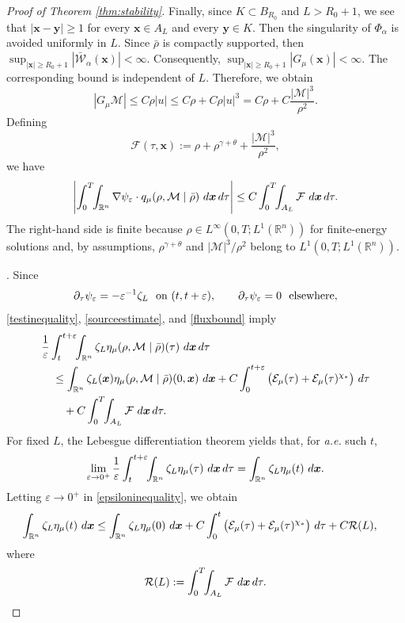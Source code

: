 \documentclass[10pt,a4paper]{amsart}
\newcommand{\R}{\mathbb{R}}
\def\dd{{\, \rm d}}
\begin{document}
\begin{proof}[Proof of {\rm Theorem \ref{thm:stability}}]
Finally, since $K\subset B_{R_0}$ and $L>R_0+1$, 
we see that $|\boldsymbol{x}-\boldsymbol{y}|\ge 1$
for every
$\boldsymbol{x}\in A_L$ and every $\boldsymbol{y}\in K$.
Then the singularity of
$\Phi_\alpha$ is avoided uniformly in $L$.  Since $\bar\rho$ is compactly
supported, then
$\sup_{|\boldsymbol{x}|\ge R_0+1}
|\bar{\mathcal W}_\alpha(\boldsymbol{x})|<\infty.$
Consequently,
$\sup_{|\boldsymbol{x}|\ge R_0+1}|G_\mu(\boldsymbol{x})|<\infty.$
The corresponding bound is independent of $L$.  
Therefore, we obtain
\[
|G_\mu\mathcal M|
\le C\rho |u|
\le C\rho+C\rho |u|^3
=C\rho+C\frac{|\mathcal M|^3}{\rho^2}.
\]
Defining
\[
 \mathcal{F}(\tau,\boldsymbol{x}) :=\rho+\rho^{\gamma+\theta}+\frac{|\mathcal M|^3}{\rho^2},
\]
we have
\begin{equation}\label{fluxbound}
\left|\int_0^T\!\!\int_{\mathbb R^n}
\nabla\psi_\varepsilon\cdot q_\mu(\rho,\mathcal M\mid\bar\rho)\,\dd\boldsymbol{x}\dd\tau\right|
\le
C\int_0^T\!\!\int_{A_L} \mathcal{F}\,\dd\boldsymbol{x}\dd\tau.
\end{equation}
The right-hand side is finite because $\rho\in L^\infty(0,T;L^1(\R^n))$ for finite-energy solutions and, by assumptions,
$\rho^{\gamma+\theta}$ and $|\mathcal M|^3/\rho^2$ belong to $L^1(0,T;L^1(\R^n))$.

. Since
\[
\partial_\tau\psi_\varepsilon =-\varepsilon^{-1}\zeta_L
 \,\,\,\,\hbox{on }(t,t+\varepsilon),
     \qquad
\partial_\tau\psi_\varepsilon=0
\,\,\,\,\hbox{elsewhere},
\]
\eqref{testinequality}, \eqref{sourceestimate}, and \eqref{fluxbound} imply
\begin{align}\label{epsiloninequality}
&\frac1\varepsilon\int_t^{t+\varepsilon}\!\!\int_{\mathbb R^n}
\zeta_L\eta_\mu(\rho,\mathcal M\mid\bar\rho)(\tau)\,\dd\boldsymbol{x}\dd\tau
\nonumber\\
&\quad\le
\int_{\mathbb R^n}\zeta_L(\boldsymbol{x})
\eta_\mu(\rho,\mathcal M\mid\bar\rho)(0,\boldsymbol{x})\,\dd\boldsymbol{x}
+C\int_0^{t+\varepsilon}\big(\mathcal E_\mu(\tau)+\mathcal E_\mu(\tau)^{\chi_*}\big)\,\dd\tau
\nonumber\\
&\qquad
+C\int_0^T\!\!\int_{A_L} \mathcal{F}\,\dd\boldsymbol{x}\dd\tau.
\end{align}
For fixed $L$, the Lebesgue differentiation theorem yields that, for {\it a.e.} such $t$,
\[
\lim_{\varepsilon\to0^+}
\frac1\varepsilon\int_t^{t+\varepsilon}\!\!\int_{\mathbb R^n}
\zeta_L\eta_\mu(\tau)\,\dd\boldsymbol{x}\dd\tau
=
\int_{\mathbb R^n}\zeta_L\eta_\mu(t)\,\dd\boldsymbol{x}.
\]
Letting $\varepsilon\to0^+$ in \eqref{epsiloninequality}, we obtain
\begin{align}\label{localL}
\int_{\mathbb R^n}\zeta_L\eta_\mu(t)\,\dd\boldsymbol{x}
&\le
\int_{\mathbb R^n}\zeta_L\eta_\mu(0)\,\dd\boldsymbol{x}
+C\int_0^t\big(\mathcal E_\mu(\tau)+\mathcal E_\mu(\tau)^{\chi_*}\big)\,\dd\tau
+C\mathcal R(L),
\end{align}
where
\[
 \mathcal R(L):=
 \int_0^T\!\!\int_{A_L} \mathcal{F}\,\dd\boldsymbol{x}\dd\tau.
\]


\end{proof}
\end{document}
